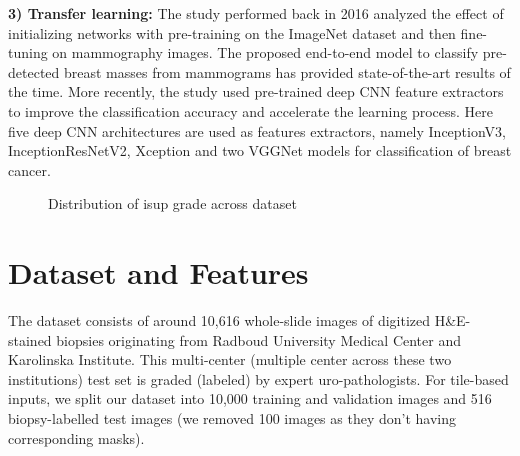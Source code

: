 \documentclass[10pt,twocolumn,letterpaper]{article}
\begin{document}


\textbf{3) Transfer learning:}
The study \cite{levy2016breast} performed back in 2016 analyzed the effect of initializing networks with pre-training on the ImageNet dataset and then fine-tuning on mammography images. The proposed end-to-end model to classify pre-detected breast masses from mammograms has provided state-of-the-art results of the time. More recently, the study \cite{kassani2019breast} used pre-trained deep CNN feature extractors to improve the classification accuracy and accelerate the learning process. Here five deep CNN architectures are used as features extractors, namely InceptionV3, InceptionResNetV2, Xception and two VGGNet models for classification of breast cancer.

\begin{figure}[t]
\begin{center}
\end{center}
   \caption{Distribution of isup grade across dataset}
\label{fig:grade_dist}
\end{figure}
\section{Dataset and Features}
 The dataset consists of around 10,616 whole-slide images of digitized H\&E-stained biopsies originating from Radboud University Medical Center and Karolinska Institute. This multi-center (multiple center across these two institutions) test set is graded (labeled) by expert uro-pathologists. For tile-based inputs, we split our dataset into 10,000 training and validation images and 516 biopsy-labelled test images (we removed 100 images as they don't having corresponding masks).
 
\end{document}
